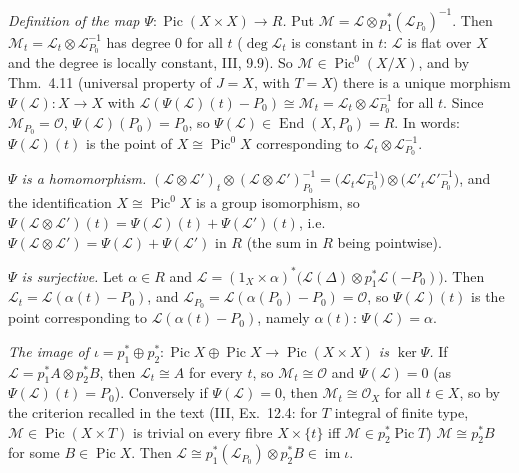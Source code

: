 \documentclass[11pt]{article}
\begin{document}
\emph{Definition of the map $\Psi:\operatorname{Pic}(X\times X)\to R$.} Put $\mathcal M=\mathcal L\otimes p_1^*(\mathcal L_{P_0})^{-1}$. Then $\mathcal M_t=\mathcal L_t\otimes\mathcal L_{P_0}^{-1}$ has degree $0$ for all $t$ ($\deg\mathcal L_t$ is constant in $t$: $\mathcal L$ is flat over $X$ and the degree is locally constant, III, 9.9). So $\mathcal M\in\operatorname{Pic}^0(X/X)$, and by Thm.~4.11 (universal property of $J=X$, with $T=X$) there is a unique morphism $\Psi(\mathcal L):X\to X$ with $\mathcal L(\Psi(\mathcal L)(t)-P_0)\cong\mathcal M_t=\mathcal L_t\otimes\mathcal L_{P_0}^{-1}$ for all $t$. Since $\mathcal M_{P_0}=\mathcal O$, $\Psi(\mathcal L)(P_0)=P_0$, so $\Psi(\mathcal L)\in\operatorname{End}(X,P_0)=R$. In words: $\Psi(\mathcal L)(t)$ is the point of $X\cong\operatorname{Pic}^0X$ corresponding to $\mathcal L_t\otimes\mathcal L_{P_0}^{-1}$.

\emph{$\Psi$ is a homomorphism.} $(\mathcal L\otimes\mathcal L')_t\otimes(\mathcal L\otimes\mathcal L')_{P_0}^{-1}=\bigl(\mathcal L_t\mathcal L_{P_0}^{-1}\bigr)\otimes\bigl(\mathcal L'_t\mathcal L'^{-1}_{P_0}\bigr)$, and the identification $X\cong\operatorname{Pic}^0X$ is a group isomorphism, so $\Psi(\mathcal L\otimes\mathcal L')(t)=\Psi(\mathcal L)(t)+\Psi(\mathcal L')(t)$, i.e.\ $\Psi(\mathcal L\otimes\mathcal L')=\Psi(\mathcal L)+\Psi(\mathcal L')$ in $R$ (the sum in $R$ being pointwise).

\emph{$\Psi$ is surjective.} Let $\alpha\in R$ and $\mathcal L=(1_X\times\alpha)^*\bigl(\mathcal L(\Delta)\otimes p_1^*\mathcal L(-P_0)\bigr)$. Then $\mathcal L_t=\mathcal L(\alpha(t)-P_0)$, and $\mathcal L_{P_0}=\mathcal L(\alpha(P_0)-P_0)=\mathcal O$, so $\Psi(\mathcal L)(t)$ is the point corresponding to $\mathcal L(\alpha(t)-P_0)$, namely $\alpha(t)$: $\Psi(\mathcal L)=\alpha$.

\emph{The image of $\iota=p_1^*\oplus p_2^*:\operatorname{Pic}X\oplus\operatorname{Pic}X\to\operatorname{Pic}(X\times X)$ is $\ker\Psi$.} If $\mathcal L=p_1^*A\otimes p_2^*B$, then $\mathcal L_t\cong A$ for every $t$, so $\mathcal M_t\cong\mathcal O$ and $\Psi(\mathcal L)=0$ (as $\Psi(\mathcal L)(t)=P_0$). Conversely if $\Psi(\mathcal L)=0$, then $\mathcal M_t\cong\mathcal O_X$ for all $t\in X$, so by the criterion recalled in the text (III, Ex.~12.4: for $T$ integral of finite type, $\mathcal M\in\operatorname{Pic}(X\times T)$ is trivial on every fibre $X\times\{t\}$ iff $\mathcal M\in p_2^*\operatorname{Pic}T$) $\mathcal M\cong p_2^*B$ for some $B\in\operatorname{Pic}X$. Then $\mathcal L\cong p_1^*(\mathcal L_{P_0})\otimes p_2^*B\in\operatorname{im}\iota$.
\end{document}
